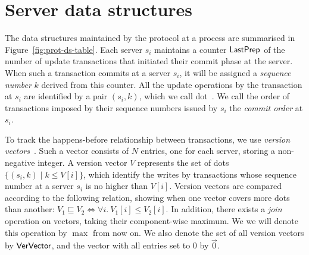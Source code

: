 \section{Server data structures}



The data structures maintained by the protocol at a process are summarised in Figure~\ref{fig:prot-ds-table}. Each server $s_i$ maintains a counter $\mathsf{LastPrep}$ of the number of update transactions that initiated their commit phase at the server. When such a transaction commits at a server $s_i$, it will be assigned a \emph{sequence number} $k$ derived from this counter. All the update operations by the transaction at $s_i$ are identified by a pair $(s_i, k)$, which we call dot~\citep{carlos-causality}. We call the order of transactions imposed by their sequence numbers issued by $s_i$ the \emph{commit order} at $s_i$.



To track the happens-before  relationship between transactions, we use \emph{version vectors}~\citep{version-vectors}. Such a vector consists of $N$ entries, one for each server, storing a non-negative integer. A version vector $V$ represents the set of dots $\{(s_i, k) \mid k \le V[i]\}$, which identify the writes by transactions whose sequence number at a server $s_i$ is no higher than $V[i]$. Version vectors are compared according to the following relation, showing when one vector covers more dots than another: $V_1 \sqsubseteq V_2 \iff \forall i.\ V_1[i] \le V_2[i]$. In addition, there exists a \emph{join} operation on vectors, taking their component-wise maximum. We we will denote this operation by $\max$ from now on. We also denote the set of all version vectors by $\mathsf{VerVector}$, and the vector with all entries set to $0$ by $\vec{0}$.

